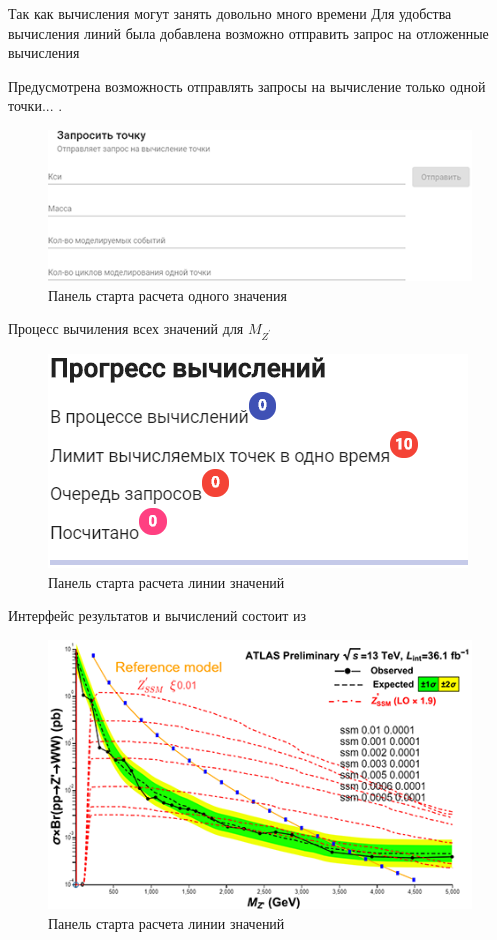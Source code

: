 Так как вычисления могут занять довольно много времени
Для удобства вычисления линий была добавлена возможно отправить запрос на отложенные вычисления 

Предусмотрена возможность отправлять запросы на вычисление только одной точки... .

\begin{figure}[!h]
	\centering
	\includegraphics[width=\textwidth]{figures/request-point.png}
	\caption{Панель старта расчета одного значения}
	\label{fig:request-point}
\end{figure}

Процесс вычиления всех значений для ${M}_{{Z}^{\prime}}$

\begin{figure}[!h]
	\centering
	\includegraphics[width=\textwidth]{figures/progress.png}
	\caption{Панель старта расчета линии значений}
	\label{fig:progress}
\end{figure}

Интерфейс результатов и вычислений состоит из

\begin{figure}[!h]
	\centering
	\includegraphics[width=\textwidth]{figures/graph-1.png}
	\caption{Панель старта расчета линии значений}
	\label{fig:graph-1}
\end{figure}

